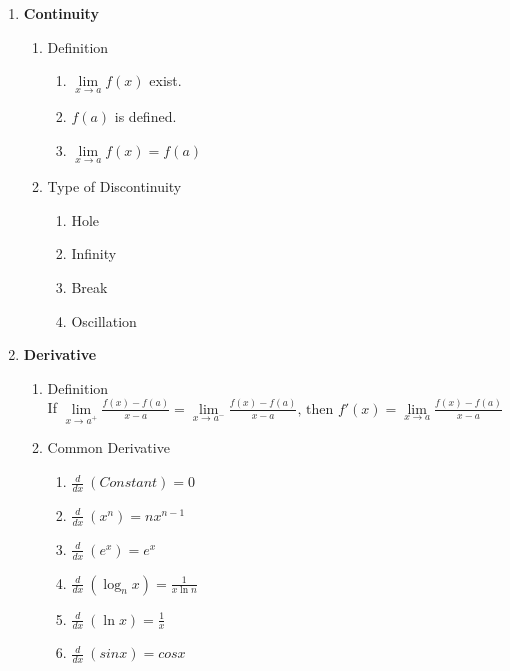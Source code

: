 \documentclass[12px]{article}
\begin{document}
\begin{enumerate}
    \item \textbf{Continuity}
    \begin{enumerate}[(1)]
        \item Definition
        \begin{multicols}{3}
            \begin{enumerate}
                \item $\lim\limits_{x\to a}f(x)$ exist.
                \item $f(a)$ is defined.
                \item $\lim\limits_{x\to a}f(x)=f(a)$
            \end{enumerate}
        \end{multicols}
        \item Type of Discontinuity
        \begin{multicols}{4}
            \begin{enumerate}
                \item Hole
                \item Infinity
                \item Break
                \item Oscillation
            \end{enumerate}
        \end{multicols}
    \end{enumerate}
    \item \textbf{Derivative}
    \begin{enumerate}[(1)]
        \item Definition\\
        If $\lim\limits_{x\to a^+}\frac{f(x)-f(a)}{x-a}=\lim\limits_{x\to a^-}\frac{f(x)-f(a)}{x-a}\text{, then } f'(x)=\lim\limits_{x\to a}\frac{f(x)-f(a)}{x-a}$
        \item Common Derivative
        \begin{multicols}{3}
            \begin{enumerate}
                \item $\frac{d}{dx}\ (Constant)=0$
                \item $\frac{d}{dx}\ (x^n)=nx^{n-1}$
                \item $\frac{d}{dx}\ (e^x)=e^x$
                \item $\frac{d}{dx}\ (\log_n{x})=\frac{1}{x\ln{n}}$
                \item $\frac{d}{dx}\ (\ln{x})=\frac{1}{x}$
                \item $\frac{d}{dx}\ (sinx)=cosx$

\end{enumerate}
\end{multicols}
\end{enumerate}
\end{enumerate}
\end{document}
